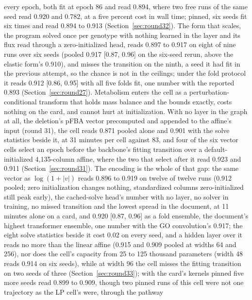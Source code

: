 \begin{description}
    every epoch, both fit at epoch 86 and read 0.894, where two free runs of the same
    seed read 0.920 and 0.782, at a five percent cost in wall time; pinned, six seeds
    fit six times and read 0.894 to 0.913 (Section~\ref{sec:round32}). The form
    that scales, the program solved once per genotype with nothing learned in the
    layer and its flux read through a zero-initialized head, reads 0.897 to 0.917 on
    eight of nine runs over six seeds (pooled 0.917 [0.87, 0.96] on the six-seed
    rerun, above the elastic form's 0.910), and misses the transition on the ninth,
    a seed it had fit in the previous attempt, so the chance is not in the ceilings;
    under the fold protocol it reads 0.912 [0.86, 0.95] with all five folds fit, one
    number with the reported 0.893 (Section~\ref{sec:round27}). Metabolism enters the cell as a
    perturbation-conditional transform that holds mass balance and the bounds exactly,
    costs nothing on the card, and cannot hurt at initialization. With no layer in the
    graph at all, the deletion's pFBA vector precomputed and appended to the affine's
    input (round 31), the cell reads 0.871 pooled alone and 0.901 with the solve
    statistics beside it, at 31 minutes per cell against 83, and four of the six
    vector cells select an epoch before the backbone's fitting transition over a
    default-initialized 4,135-column affine, where the two that select after it read
    0.923 and 0.911 (Section~\ref{sec:round31}). The encoding is the whole of that
    gap: the same vector as $\log(1 + |v|)$ reads 0.896 to 0.919 on twelve of twelve
    runs (0.912 pooled; zero initialization changes nothing, standardized columns
    zero-initialized still peak early), the cached-solve head's number with no layer,
    no solver in training, no missed transition and the lowest spread in the
    document, at 11 minutes alone on a card, and 0.920 [0.87, 0.96] as a fold
    ensemble, the document's highest transformer ensemble, one number with the GO
    convolution's 0.917; the eight solve statistics beside it cost 0.02 on every
    seed, and a hidden layer over it reads no more than the linear affine (0.915 and
    0.909 pooled at widths 64 and 256), nor does the cell's capacity from 25 to 125
    thousand parameters (width 48 reads 0.914 on six seeds), while at width 96 the
    cell misses the fitting transition on two seeds of three
    (Section~\ref{sec:round33}); with the card's
    kernels pinned five more seeds read 0.899 to 0.909, though two pinned runs of this
    cell were not one trajectory as the LP cell's were, through the pathway

\end{description}
